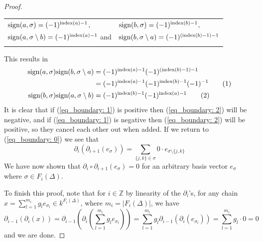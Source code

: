 \documentclass[11pt,a4paper,twoside]{report}
\newcommand\numberthis{\addtocounter{equation}{1}\tag{\theequation}}
\begin{document}
\begin{proof}
\begin{tabular}{l l}
\\
$\textnormal{sign}(a,\sigma) = (-1)^{\textnormal{index}(a)-1}$,  &$\textnormal{sign}(b,\sigma) = (-1)^{\textnormal{index}(b)-1}$,\\
$\textnormal{sign}(a,\sigma\setminus b) = (-1)^{\textnormal{index}(a)-1}$ and &$\textnormal{sign}(b,\sigma\setminus a) = (-1)^{(\textnormal{index}(b)-1)-1}$\\ \\
\end{tabular}
\newline
This results in
\begin{align*}
\textnormal{sign}(a,\sigma)\textnormal{sign}(b,\sigma\setminus a) &= (-1)^{\textnormal{index}(a)-1}(-1)^{(\textnormal{index}(b)-1)-1}\\
&= (-1)^{\textnormal{index}(a)-1}(-1)^{\textnormal{index}(b)-1}(-1)^{-1} \numberthis\label{eq_boundary: 1} \\
\textnormal{sign}(b,\sigma)\textnormal{sign}(a,\sigma\setminus b) &= (-1)^{\textnormal{index}(b)-1}(-1)^{\textnormal{index}(a)-1} \numberthis \label{eq_boundary: 2}\\
\end{align*}
It is clear that if (\ref{eq_boundary: 1}) is positive then (\ref{eq_boundary: 2}) will be negative, and if (\ref{eq_boundary: 1}) is negative then (\ref{eq_boundary: 2}) will be positive, so they cancel each other out when added. If we return to (\ref{eq_boundary: 0}) we see that 
\begin{equation*}
\partial_i(\partial_{i+1}(e_\sigma))=\sum_{\{j,k\}\in\sigma}0\cdot e_{\sigma\setminus\{j,k\}} 
\end{equation*}
We have now shown that $\partial_i\circ\partial_{i+1}(e_\sigma)=0$ for an arbitrary basis vector $e_\sigma$ where $\sigma\in F_i(\Delta)$. 

To finish this proof, note that for $i \in\mathbb{Z}$ by linearity of the $\partial_i$'s, for any chain \newline
$x = \sum_{l=1}^{m_i}g_le_{\sigma_l}\in k^{F_i(\Delta)}$, where $m_i=|F_i(\Delta)|$, we have 
\begin{equation*}
\partial_{i-1}(\partial_i(x)) = \partial_{i-1}\left(\partial_i\left(\sum_{l=1}^{m_i}g_le_{\sigma_l}\right)\right) = \sum_{l=1}^{m_i}g_l\partial_{i-1}(\partial_i(e_{\sigma_l}))=\sum_{l=1}^{m_i}g_l\cdot 0=0
\end{equation*}
and we are done.
\end{proof}
\end{document}
